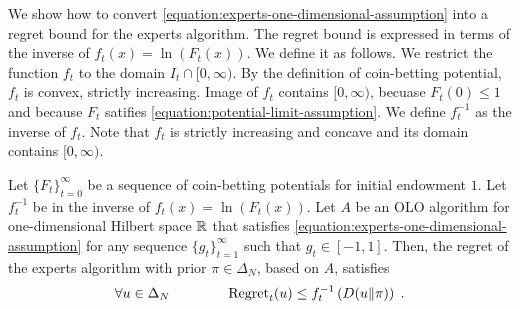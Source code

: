 We show how to convert \eqref{equation:experts-one-dimensional-assumption} into
a regret bound for the experts algorithm. The regret bound is expressed in terms
of the inverse of $f_t(x) = \ln(F_t(x))$. We define it as follows. We
restrict the function $f_t$ to the domain $I_t \cap [0, \infty)$. By the
definition of coin-betting potential, $f_t$ is convex, strictly increasing.
Image of $f_t$ contains $[0,\infty)$, becuase $F_t(0) \le 1$ and because $F_t$
satifies \eqref{equation:potential-limit-assumption}. We define $f_t^{-1}$ as
the inverse of $f_t$. Note that $f_t$ is strictly increasing and concave and its
domain contains $[0, \infty)$.

\begin{theorem}
Let $\{F_t\}_{t=0}^\infty$ be a sequence of coin-betting potentials for initial
endowment $1$. Let $f_t^{-1}$ be in the inverse of $f_t(x) = \ln(F_t(x))$.
Let $A$ be an OLO algorithm for one-dimensional Hilbert space
$\mathbb{R}$ that satisfies \eqref{equation:experts-one-dimensional-assumption} for any
sequence $\{g_t\}_{t=1}^\infty$ such that $g_t \in [-1,1]$. Then, the regret of
the experts algorithm with prior $\pi \in \Delta_N$, based on $A$, satisfies
$$
\forall u \in \Delta_N \qquad \qquad
\operatorname{Regret}_t(u) \le f_t^{-1}\left( D({u}\|{\pi}) \right) \; .
$$
\end{theorem}

